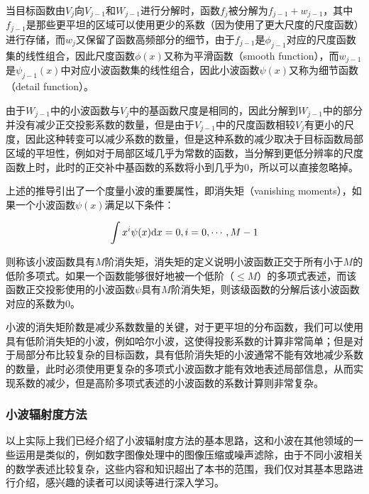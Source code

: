 当目标函数由$V_j$向$V_{j-1}$和$W_{j-1}$进行分解时，函数$f_j$被分解为$f_{j-1}+w_{j-1}$，其中$f_{j-1}$是那些更平坦的区域可以使用更少的系数（因为使用了更大尺度的尺度函数）进行存储，而$w_j$又保留了函数高频部分的细节，由于$f_{j-1}$是$\phi_{j-1}$对应的尺度函数集的线性组合，因此尺度函数$\phi(x)$又称为平滑函数（smooth function），而$w_{j-1}$是$\psi_{j-1}(x)$中对应小波函数集的线性组合，因此小波函数$\psi(x)$又称为细节函数（detail function）。

由于$W_{j-1}$中的小波函数与$V_j$中的基函数尺度是相同的，因此分解到$W_{j-1}$中的部分并没有减少正交投影系数的数量，但是由于$V_{j-1}$中的尺度函数相较$V_j$有更小的尺度，因此这种转变可以减少系数的数量，但是这种系数的减少取决于目标函数局部区域的平坦性，例如对于局部区域几乎为常数的函数，当分解到更低分辨率的尺度函数上时，此时的正交补中基函数的系数将小到几乎为0，所以可以直接忽略掉。

上述的推导引出了一个度量小波的重要属性，即消失矩（vanishing moments），如果一个小波函数$\psi(x)$满足以下条件：

\begin{equation}
	\int x^{i} \psi(x){\rm d}x=0,i=0,\cdots,M-1
\end{equation}

\noindent 则称该小波函数具有$M$阶消失矩，消失矩的定义说明小波函数正交于所有小于$M$的低阶多项式。如果一个函数能够很好地被一个低阶（$\leq M$）的多项式表述，而该函数正交投影使用的小波函数$\psi$具有$M$阶消失矩，则该级函数的分解后该小波函数对应的系数为0。

小波的消失矩阶数是减少系数数量的关键，对于更平坦的分布函数，我们可以使用具有低阶消失矩的小波，例如哈尔小波，这使得投影系数的计算非常简单；但是对于局部分布比较复杂的目标函数，具有低阶消失矩的小波通常不能有效地减少系数的数量，此时必须使用更复杂的多项式小波函数才能有效地表述局部信息，从而实现系数的减少，但是高阶多项式表述的小波函数的系数计算则非常复杂。




\subsubsection{小波辐射度方法}\label{sec:r-wavelet-radiosity}
以上实际上我们已经介绍了小波辐射度方法的基本思路，这和小波在其他领域的一些运用是类似的，例如数字图像处理中的图像压缩或噪声滤除\cite{b:DigitalImageProcessing}，由于不同小波相关的数学表述比较复杂，这些内容和知识超出了本书的范围，我们仅对其基本思路进行介绍，感兴趣的读者可以阅读\cite{a:WaveletaRadiosity,a:WaveletMethodsforComputerGraphics,a:WaveletRadiosityonArbitraryPlanarSurfaces,a:RadiosityinFlatland}等进行深入学习。

